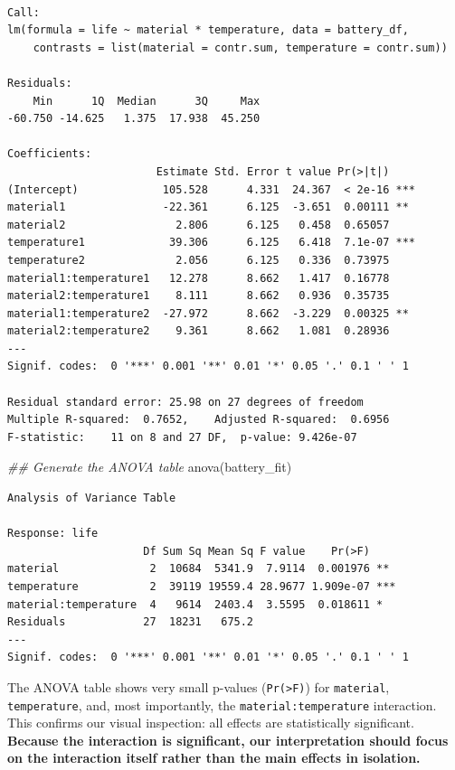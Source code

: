 \documentclass[
  letterpaper,
]{scrbook}
\newenvironment{Shaded}{\begin{snugshade}}{\end{snugshade}}
\newcommand{\DocumentationTok}[1]{\textcolor[rgb]{0.37,0.37,0.37}{\textit{#1}}}
\newcommand{\FunctionTok}[1]{\textcolor[rgb]{0.28,0.35,0.67}{#1}}
\newcommand{\NormalTok}[1]{\textcolor[rgb]{0.00,0.23,0.31}{#1}}
\begin{document}
\begin{verbatim}

Call:
lm(formula = life ~ material * temperature, data = battery_df, 
    contrasts = list(material = contr.sum, temperature = contr.sum))

Residuals:
    Min      1Q  Median      3Q     Max 
-60.750 -14.625   1.375  17.938  45.250 

Coefficients:
                       Estimate Std. Error t value Pr(>|t|)    
(Intercept)             105.528      4.331  24.367  < 2e-16 ***
material1               -22.361      6.125  -3.651  0.00111 ** 
material2                 2.806      6.125   0.458  0.65057    
temperature1             39.306      6.125   6.418  7.1e-07 ***
temperature2              2.056      6.125   0.336  0.73975    
material1:temperature1   12.278      8.662   1.417  0.16778    
material2:temperature1    8.111      8.662   0.936  0.35735    
material1:temperature2  -27.972      8.662  -3.229  0.00325 ** 
material2:temperature2    9.361      8.662   1.081  0.28936    
---
Signif. codes:  0 '***' 0.001 '**' 0.01 '*' 0.05 '.' 0.1 ' ' 1

Residual standard error: 25.98 on 27 degrees of freedom
Multiple R-squared:  0.7652,    Adjusted R-squared:  0.6956 
F-statistic:    11 on 8 and 27 DF,  p-value: 9.426e-07
\end{verbatim}

\begin{Shaded}
\begin{Highlighting}[]
\DocumentationTok{\#\# Generate the ANOVA table}
\FunctionTok{anova}\NormalTok{(battery\_fit)}
\end{Highlighting}
\end{Shaded}

\begin{verbatim}
Analysis of Variance Table

Response: life
                     Df Sum Sq Mean Sq F value    Pr(>F)    
material              2  10684  5341.9  7.9114  0.001976 ** 
temperature           2  39119 19559.4 28.9677 1.909e-07 ***
material:temperature  4   9614  2403.4  3.5595  0.018611 *  
Residuals            27  18231   675.2                      
---
Signif. codes:  0 '***' 0.001 '**' 0.01 '*' 0.05 '.' 0.1 ' ' 1
\end{verbatim}

The ANOVA table shows very small p-values (\texttt{Pr(\textgreater{}F)})
for \texttt{material}, \texttt{temperature}, and, most importantly, the
\texttt{material:temperature} interaction. This confirms our visual
inspection: all effects are statistically significant. \textbf{Because
the interaction is significant, our interpretation should focus on the
interaction itself rather than the main effects in isolation.}
\end{document}
